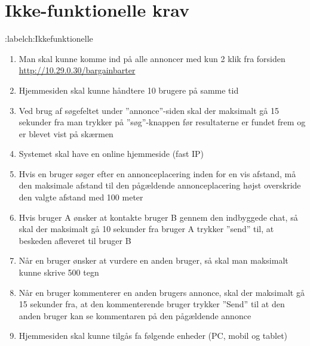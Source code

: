 \chapter{Ikke-funktionelle krav}:label{ch:Ikkefunktionelle}

\begin{enumerate}
	\item Man skal kunne komme ind på alle annoncer med kun 2 klik fra forsiden \url{http://10.29.0.30/bargainbarter}
	
	\item Hjemmesiden skal kunne håndtere 10 brugere på samme tid
	
	\item Ved brug af søgefeltet under ''annonce''-siden skal der maksimalt gå 15 sekunder fra man trykker på ''søg''-knappen før resultaterne er fundet frem og er blevet vist på skærmen
	
	\item Systemet skal have en online hjemmeside (fast IP)
		
	\item Hvis en bruger søger efter en annonceplacering inden for en vis afstand, må den maksimale afstand til den pågældende annonceplacering højst overskride den valgte afstand med 100 meter
	
	\item Hvis bruger A ønsker at kontakte bruger B gennem den indbyggede chat, så skal der maksimalt  gå 10 sekunder fra bruger A trykker ''send'' til, at beskeden afleveret til bruger B
	
	\item Når en bruger ønsker at vurdere en anden bruger, så skal man maksimalt kunne skrive 500 tegn
	
	\item Når en bruger kommenterer en anden brugers annonce, skal der maksimalt gå 15 sekunder fra, at den kommenterende bruger trykker ''Send'' til at den anden bruger kan se kommentaren på den pågældende annonce
	
	\item Hjemmesiden skal kunne tilgås fa følgende enheder (PC, mobil og tablet)
	
\end{enumerate}